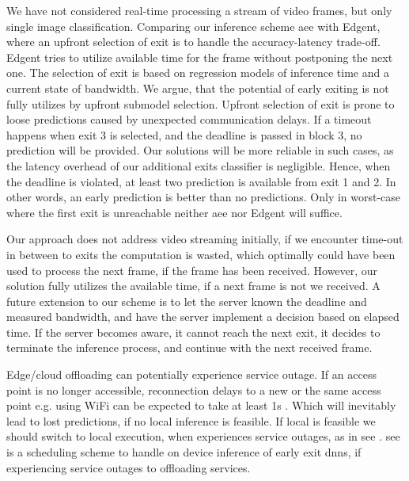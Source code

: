 We have not considered real-time processing a stream of video frames, but only single image classification. Comparing our inference scheme \gls{aee} with Edgent, where an upfront selection of exit is to handle the accuracy-latency trade-off. Edgent tries to utilize available time for the frame without postponing the next one. The selection of exit is based on regression models of inference time and a current state of bandwidth.  We argue, that the potential of early exiting is not fully utilizes by upfront submodel selection. Upfront selection of exit is prone to loose predictions caused by unexpected communication delays. If a timeout happens when exit 3 is selected, and the deadline is passed in block 3, no prediction will be provided. Our solutions will be more reliable in such cases, as the latency overhead of our additional exits classifier is negligible. Hence, when the deadline is violated, at least two prediction is available from exit 1 and 2. In other words, an early prediction is better than no predictions. Only in worst-case where the first exit is unreachable neither \gls{aee} nor Edgent will suffice. 

Our approach does not address video streaming initially, if we encounter time-out in between to exits the computation is wasted, which optimally could have been used to process the next frame, if the frame has been received. However, our solution fully utilizes the available time, if a next frame is not we received. A future extension to our scheme is to let the server known the deadline and measured bandwidth, and have the server implement a decision based on elapsed time. If the server becomes aware, it cannot reach the next exit, it decides to terminate the inference process, and continue with the next received frame.

Edge/cloud offloading can potentially experience service outage. If an access point is no longer accessible, reconnection delays to a new or the same access point e.g. using WiFi can be expected to take at least 1s \cite{pei_why_2017}. Which will inevitably lead to lost predictions, if no local inference is feasible. If local is feasible we should switch to local execution, when experiences service outages, as in \gls{see} \cite{wang_see:_2019}. \gls{see} is a scheduling scheme to handle on device inference of early exit \gls{dnn}s, if experiencing service outages to offloading services.

